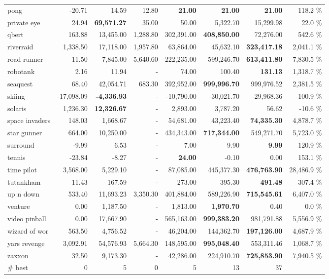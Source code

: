 \documentclass{article}
\begin{document}
\begin{table}
\begin{center}
\begin{tabularx}{0.900000\textwidth}{X| r r r r r r r}
pong &-20.71 & 14.59 & 12.80 & \textbf{21.00} & \textbf{21.00} & \textbf{21.00} & 118.2 \%\\
private eye &24.94 & \textbf{69,571.27} & 35.00 & 50.00 & 5,322.70 & 15,299.98 & 22.0 \%\\
qbert &163.88 & 13,455.00 & 1,288.80 & 302,391.00 & \textbf{408,850.00} & 72,276.00 & 542.6 \%\\
riverraid &1,338.50 & 17,118.00 & 1,957.80 & 63,864.00 & 45,632.10 & \textbf{323,417.18} & 2,041.1 \%\\
road runner &11.50 & 7,845.00 & 5,640.60 & 222,235.00 & 599,246.70 & \textbf{613,411.80} & 7,830.5 \%\\
robotank &2.16 & 11.94 & - & 74.00 & 100.40 & \textbf{131.13} & 1,318.7 \%\\
seaquest &68.40 & 42,054.71 & 683.30 & 392,952.00 & \textbf{999,996.70} & 999,976.52 & 2,381.5 \%\\
skiing &-17,098.09 & \textbf{-4,336.93} & - & -10,790.00 & -30,021.70 & -29,968.36 & -100.9 \%\\
solaris &1,236.30 & \textbf{12,326.67} & - & 2,893.00 & 3,787.20 & 56.62 & -10.6 \%\\
space invaders &148.03 & 1,668.67 & - & 54,681.00 & 43,223.40 & \textbf{74,335.30} & 4,878.7 \%\\
star gunner &664.00 & 10,250.00 & - & 434,343.00 & \textbf{717,344.00} & 549,271.70 & 5,723.0 \%\\
surround &-9.99 & 6.53 & - & 7.00 & 9.90 & \textbf{9.99} & 120.9 \%\\
tennis &-23.84 & -8.27 & - & \textbf{24.00} & -0.10 & 0.00 & 153.1 \%\\
time pilot &3,568.00 & 5,229.10 & - & 87,085.00 & 445,377.30 & \textbf{476,763.90} & 28,486.9 \%\\
tutankham &11.43 & 167.59 & - & 273.00 & 395.30 & \textbf{491.48} & 307.4 \%\\
up n down &533.40 & 11,693.23 & 3,350.30 & 401,884.00 & 589,226.90 & \textbf{715,545.61} & 6,407.0 \%\\
venture &0.00 & 1,187.50 & - & 1,813.00 & \textbf{1,970.70} & 0.40 & 0.0 \%\\
video pinball &0.00 & 17,667.90 & - & 565,163.00 & \textbf{999,383.20} & 981,791.88 & 5,556.9 \%\\
wizard of wor &563.50 & 4,756.52 & - & 46,204.00 & 144,362.70 & \textbf{197,126.00} & 4,687.9 \%\\
yars revenge &3,092.91 & 54,576.93 & 5,664.30 & 148,595.00 & \textbf{995,048.40} & 553,311.46 & 1,068.7 \%\\
zaxxon &32.50 & 9,173.30 & - & 42,286.00 & 224,910.70 & \textbf{725,853.90} & 7,940.5 \%\\
\midrule
\# best & 0 & 5 & 0 & 5 & 13 & 37\\
\bottomrule
\end{tabularx}
\end{center}



\end{table}
\end{document}
